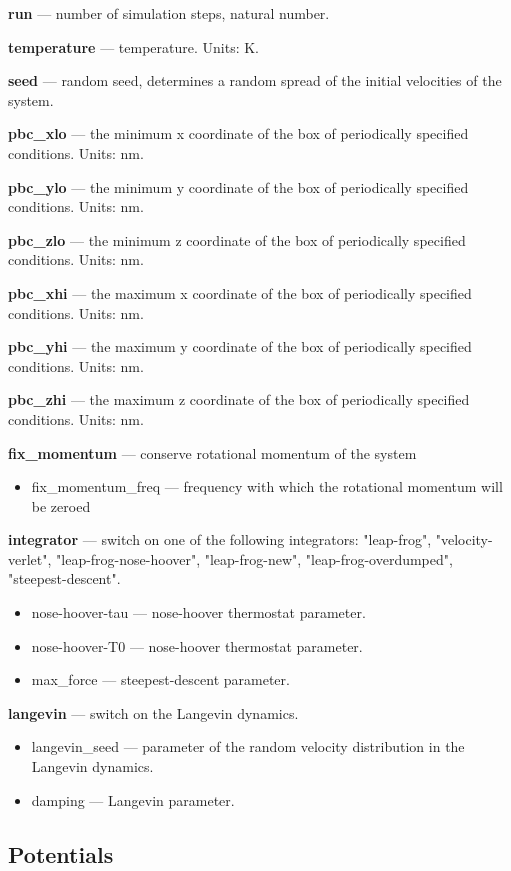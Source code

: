 \documentclass[12pt,a4paper]{article}
\begin{document}
{\bf run} --- number of simulation steps, natural number. 

{\bf temperature} --- temperature. Units: K.

{\bf seed} --- random seed, determines a random spread of the initial velocities of the system.

{\bf pbc\_xlo} --- the minimum x coordinate of the box of periodically specified conditions. Units: nm.

{\bf pbc\_ylo} --- the minimum y coordinate of the box of periodically specified conditions. Units: nm.

{\bf pbc\_zlo} --- the minimum z coordinate of the box of periodically specified conditions. Units: nm.

{\bf pbc\_xhi} --- the maximum x coordinate of the box of periodically specified conditions. Units: nm.

{\bf pbc\_yhi} --- the maximum y coordinate of the box of periodically specified conditions. Units: nm.

{\bf pbc\_zhi} --- the maximum z coordinate of the box of periodically specified conditions. Units: nm.


{\bf fix\_momentum} --- conserve rotational momentum of the system
\begin{itemize}
\item fix\_momentum\_freq --- frequency with which the rotational momentum will be zeroed
\end{itemize}


{\bf integrator} --- switch on one of the following integrators:
"leap-frog", "velocity-verlet", "leap-frog-nose-hoover", "leap-frog-new", "leap-frog-overdumped", "steepest-descent".
\begin{itemize}
\item nose-hoover-tau --- nose-hoover thermostat parameter.
\item nose-hoover-T0 --- nose-hoover thermostat parameter.
\item max\_force --- steepest-descent parameter.
\end{itemize}

{\bf langevin} --- switch on the Langevin dynamics.
\begin{itemize}
\item langevin\_seed --- parameter of the random velocity distribution in the Langevin dynamics.
\item damping --- Langevin parameter.
\end{itemize}

\subsection{Potentials}
\end{document}
